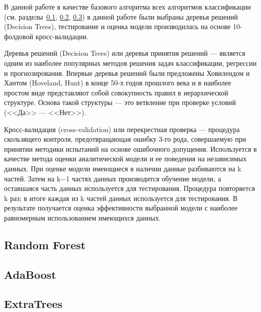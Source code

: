 В данной работе в качестве базового алгоритма всех алгоритмов классификации (см. разделы~\ref{random_forest},
\ref{ada}, \ref{extra}) в данной работе были выбраны деревья решений 
(Decision Trees), тестирование и оценка модели производилась на основе 10-фолдовой кросс-валидации.

Деревья решений (Decision Trees) или деревья принятия решений --- является одним из наиболее популярных
методов решения задач классификации, регрессии и прогнозирования. Впервые деревья решений были предложены Ховилендом и Хантом (Hoveland, Hunt) 
в конце 50-х годов прошлого века и в наиболее простом виде представляют собой совокупность правил в иерархической 
структуре. Основа такой структуры --- это ветвление при проверке условий (<<Да>> --- <<Нет>>).~\cite{data_mining} 

Кросс-валидация (cross-validation) или перекрестная проверка --- 
процедура скользящего контроля, предотвращающая ошибку 3-го рода, совершаемую 
при принятии методики испытаний на основе ошибочного допущения. Используется в качестве метода оценки
аналитической модели и ее поведения на независимых данных. При оценке модели имеющиеся в наличии 
данные разбиваются на k частей. Затем на k−1 частях данных производится обучение модели, 
а оставшаяся часть данных используется для тестирования. Процедура повторяется k раз; 
в итоге каждая из k частей данных используется для тестирования. 
В результате получается оценка эффективности выбранной модели с наиболее равномерным 
использованием имеющихся данных.~\cite{crossval}




\subsection{Random Forest}\label{random_forest}

 

\subsection{AdaBoost}\label{ada}


\subsection{ExtraTrees}\label{extra}
